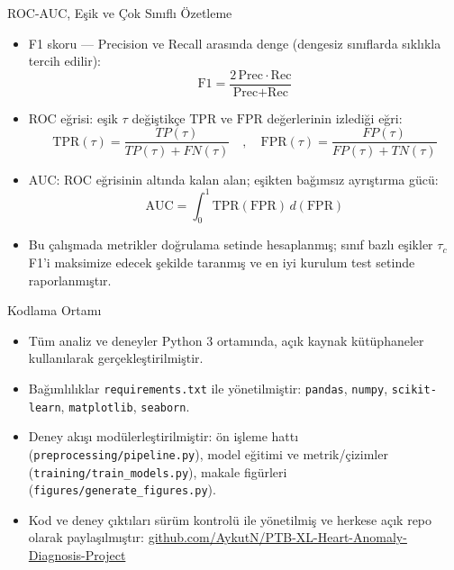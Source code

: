 \documentclass[aspectratio=169]{beamer}
\def\textbf#1{#1}%
\begin{document}
\begin{frame}{ROC-AUC, Eşik ve Çok Sınıflı Özetleme}
	\small
	\begin{itemize}
		\item \textbf{F1 skoru} — Precision ve Recall arasında denge (dengesiz sınıflarda sıklıkla tercih edilir):
		\[
		\text{F1}= \frac{2\,\text{Prec}\cdot\text{Rec}}{\text{Prec}+\text{Rec}}
		\]
		\item \textbf{ROC eğrisi}: eşik \(\tau\) değiştikçe \(\text{TPR}\) ve \(\text{FPR}\) değerlerinin izlediği eğri:
		\[
		\text{TPR}(\tau)=\frac{TP(\tau)}{TP(\tau)+FN(\tau)} \quad,\quad
		\text{FPR}(\tau)=\frac{FP(\tau)}{FP(\tau)+TN(\tau)}
		\]
		\item \textbf{AUC}: ROC eğrisinin altında kalan alan; eşikten bağımsız ayrıştırma gücü:
		\[
		\text{AUC}=\int_{0}^{1}\text{TPR}(\text{FPR})\,d(\text{FPR})
		\]
		
		\item Bu çalışmada metrikler doğrulama setinde hesaplanmış; sınıf bazlı eşikler \(\tau_c\) F1’i maksimize edecek şekilde taranmış ve en iyi kurulum test setinde raporlanmıştır.
	\end{itemize}
\end{frame}
\begin{frame}{Kodlama Ortamı}
	\begin{itemize}
		\item Tüm analiz ve deneyler Python 3 ortamında, açık kaynak kütüphaneler kullanılarak gerçekleştirilmiştir.
		\item Bağımlılıklar \texttt{requirements.txt} ile yönetilmiştir: \texttt{pandas}, \texttt{numpy}, \texttt{scikit-learn}, \texttt{matplotlib}, \texttt{seaborn}.
		\item Deney akışı modülerleştirilmiştir: ön işleme hattı (\texttt{preprocessing/pipeline.py}), model eğitimi ve metrik/çizimler (\texttt{training/train\_models.py}), makale figürleri (\texttt{figures/generate\_figures.py}).
		\item Kod ve deney çıktıları sürüm kontrolü ile yönetilmiş ve herkese açık repo olarak paylaşılmıştır: \href{https://github.com/AykutN/PTB-XL-Heart-Anomaly-Diagnosis-Project}{github.com/AykutN/PTB-XL-Heart-Anomaly-Diagnosis-Project}
	\end{itemize}
\end{frame}

\end{document}
